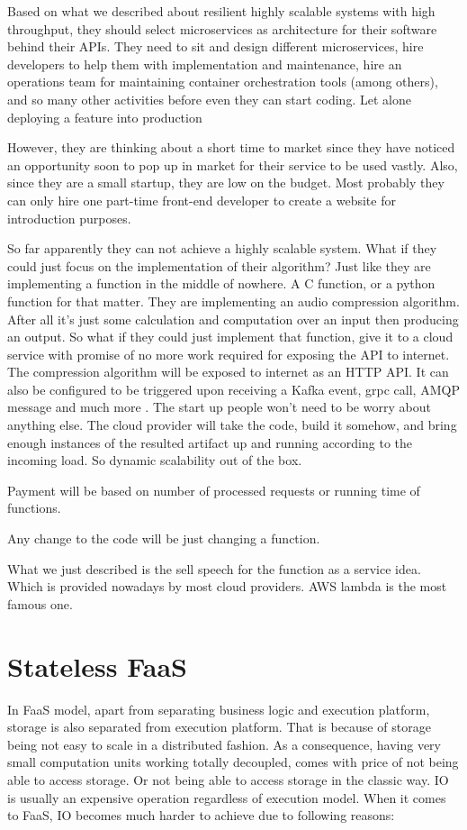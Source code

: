 \documentclass[a4]{report}
\begin{document}
    Based on what we described about resilient highly scalable systems with high throughput, they should select
    microservices as architecture for their software behind their APIs.
    They need to sit and design different microservices, hire developers to help them with implementation and
    maintenance, hire an operations team for maintaining container orchestration tools (among others), and so many
    other activities before even they can start coding.
    Let alone deploying a feature into production

    However, they are thinking about a short time to market since they have noticed an opportunity soon to pop up in
    market for their service to be used vastly.
    Also, since they are a small startup, they are low on the budget.
    Most probably they can only hire one part-time front-end developer to create a website for introduction
    purposes.

    So far apparently they can not achieve a highly scalable system.
    What if they could just focus on the implementation of their algorithm?
    Just like they are implementing a function in the middle of nowhere.
    A C function, or a python function for that matter.
    They are implementing an audio compression algorithm.
    After all it's just some calculation and computation over an input then producing an output.
    So what if they could just implement that function, give it to a cloud service with promise of no more work
    required for exposing the API to internet.
    The compression algorithm will be exposed to internet as an HTTP API.
    It can also be configured to be triggered upon receiving a Kafka event, grpc call, AMQP message and much more .
    The start up people won't need to be worry about anything else.
    The cloud provider will take the code, build it somehow, and bring enough instances of the resulted artifact up and
    running according to the incoming load.
    So dynamic scalability out of the box.

    Payment will be based on number of processed requests or running time of functions.

    Any change to the code will be just changing a function.

    What we just described is the sell speech for the function as a service idea.
    Which is provided nowadays by most cloud providers.
    AWS lambda is the most famous one.


    \section{Stateless FaaS}
    In FaaS model, apart from separating business logic and execution platform, storage is also separated from
    execution platform.
    That is because of storage being not easy to scale in a distributed fashion.
    As a consequence, having very small computation units working totally decoupled, comes with price of not being
    able to access storage.
    Or not being able to access storage in the classic way.
    IO is usually an expensive operation regardless of execution model.
    When it comes to FaaS, IO becomes much harder to achieve due to following reasons:
\end{document}
